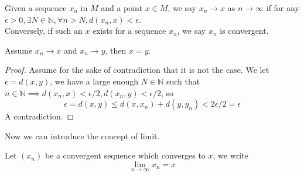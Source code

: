 \begin{definition}
    Given a sequence $x_n$ in $M$ and a point $x\in M$, we say $x_n\to x$ as $n\to\infty$ if for any $\epsilon>0,\exists N\in\mathbb N,\forall n>N,d(x_n,x)<\epsilon$.\\
    Conversely, if such an $x$ exists for a sequence $x_n$, we say $x_n$ is convergent.
\end{definition}
\begin{lemma}
    Assume $x_n\to x$ and $x_n\to y$, then $x=y$.
\end{lemma}
\begin{proof}
    Assume for the sake of contradiction that it is not the case.
    We let $\epsilon=d(x,y)$, we have a large enough $N\in\mathbb N$ such that $n\in\mathbb N\implies d(x_n,x)<\epsilon/2, d(x_n,y)<\epsilon/2$, so
    $$\epsilon=d(x,y)\le d(x,x_n)+d(y,y_n)<2\epsilon/2=\epsilon$$
    A contradiction.
\end{proof}
Now we can introduce the concept of limit.
\begin{definition}
    Let $(x_n)$ be a convergent sequence which converges to $x$, we write
    $$\lim_{n\to\infty}x_n=x$$
\end{definition}
